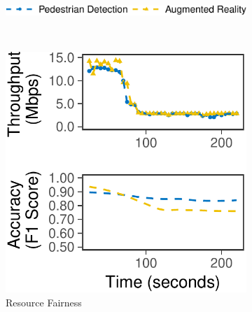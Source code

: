 \begin{figure}
  \centering
  \begin{subfigure}[t]{0.7\columnwidth}
    \centering
    \includegraphics[width=\textwidth]{figures/multitask-legend.pdf}
  \end{subfigure}
  \\
  \vspace{0.4em}
  \begin{subfigure}[t]{0.45\columnwidth}
    \centering
    \includegraphics[width=\textwidth]{figures/multitask-left.pdf}
    \caption{Resource Fairness}
    \label{fig:eq-bw}
  \end{subfigure}
  \hfill
  \begin{subfigure}[t]{0.45\columnwidth}
    \centering

\end{subfigure}
\end{figure}
